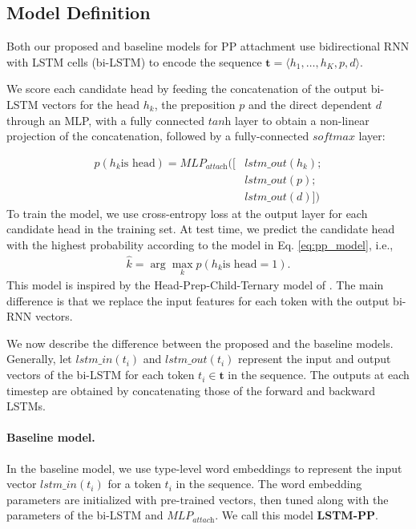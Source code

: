 \subsection{Model Definition}
Both our proposed and baseline models for PP attachment use bidirectional RNN with LSTM cells (bi-LSTM) to encode the sequence $\boldsymbol{t} = \langle h_1, \ldots, h_K, p, d \rangle$.

We score each candidate head by feeding the concatenation of the output bi-LSTM vectors for the head $h_k$, the preposition $p$ and the direct dependent $d$ through an MLP, with a fully connected $\textit{tanh}$ layer to obtain a non-linear projection of the concatenation, followed by a fully-connected $\textit{softmax}$ layer:

\begin{align}
p(h_k \text{is head}) = \textit{MLP}_{\textit{attach}}([&\textit{lstm\_out}(h_k);\nonumber \\
&\textit{lstm\_out}(p);\nonumber \\
&\textit{lstm\_out}(d)]) \label{eq:pp_model}
\end{align}
To train the model, we use cross-entropy loss at the output layer for each candidate head in the training set.
At test time, we predict the candidate head with the highest probability according to the model in Eq. \ref{eq:pp_model}, i.e.,
\begin{align}
\hat{k} = \arg\max_k p(h_k \text{is head} = 1).
\end{align}
This model is inspired by the Head-Prep-Child-Ternary model of \cite{belinkov2014exploring}. 
The main difference is that we replace the input features for each token with the output bi-RNN vectors.

We now describe the difference between the proposed and the baseline models. Generally, let $\textit{lstm\_in}(t_i)$ and $\textit{lstm\_out}(t_i)$ represent the input and output vectors of the bi-LSTM for each token $t_i \in \boldsymbol{t}$ in the sequence. The outputs at each timestep are obtained by concatenating those of the forward and backward LSTMs.

\paragraph{Baseline model.}
In the baseline model, we use type-level word embeddings to represent the input vector $\textit{lstm\_in}(t_i)$ for a token $t_i$ in the sequence. The word embedding parameters are initialized with pre-trained vectors, then tuned along with the parameters of the bi-LSTM and $\textit{MLP}_{\textit{attach}}$. We call this model \textbf{LSTM-PP}.

